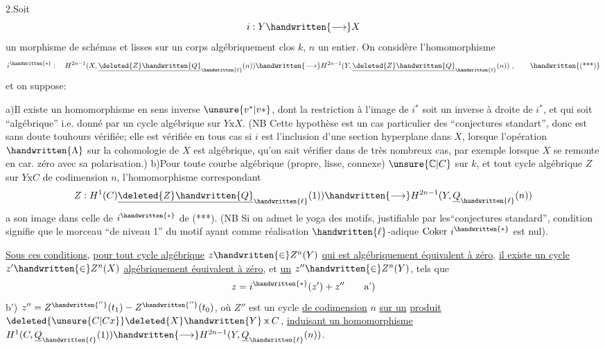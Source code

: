 2.\quad Soit
\[
i:Y\handwritten{\longrightarrow}X
\]
un morphisme de schémas  et lisses sur un corps algébriquement clos $k$, $n$ un entier. On  considère l'homomorphisme
\[
i^{\handwritten{*}}:\quad H^{2n-1}(X,\underline{\deleted{Z}\handwritten{Q}}_{\handwritten{\ell}}(n))\handwritten{\longrightarrow}H^{2n-1}(Y,\underline{\deleted{Z}\handwritten{Q}}_{\handwritten{\ell}}(n))\ ,\tag*{\handwritten{(***)}}
\]
et on suppose:

a)\quad Il existe un homomorphisme en sens inverse $\unsure{v^*|v*}$, dont la restriction à l'image de $i^*$ soit un inverse à droite de $i^*$, et qui soit ``algébrique'' i.e. donné par un cycle algébrique sur $Y\mathbin{\mathrm{x}}X$. (NB Cette hypothèse est un cas particulier des ``conjectures standart'', donc est sans doute touhours vérifiée; elle est vérifiée en tous cas si $i$ est l'inclusion d'une section hyperplane dans $X$, lorsque l'opération $\handwritten{\Lambda}$ sur  la cohomologie de $X$ est algébrique,   qu'on sait vérifier dans de très nombreux cas, par exemple lorsque $X$ se remonte en car. zéro avec sa polarisation.)
b)\quad Pour toute courbe algébrique (propre, lisse, connexe) $\unsure{\mathbb{C}|C}$ sur $k$, et tout cycle algébrique $Z$ sur $Y\mathbin{\mathrm{x}}C$ de codimension $n$, l'homomorphisme correspondant
\[
Z:H^1(C)\underline{\deleted{Z}\handwritten{Q}}_{\handwritten{\ell}}(1))\handwritten{\longrightarrow}H^{2n-1}(Y,\underline{Q}_{\handwritten{\ell}}(n))
\]
a son image dans celle de $i^{\handwritten{*}}$ de (***). (NB Si on admet le yoga des motifs, justifiable par les``conjectures standard'',  condition signifie que le  morceau  ``de niveau 1'' du motif  ayant comme réalisation $\handwritten{\ell}$-adique $\mathrm{Coker}\ i^{\handwritten{*}}$ est nul).

\uline{Sous ces conditions}, \uline{pour tout cycle algébrique} $z\handwritten{\in}Z^n(Y)$ \uline{qui est algébriquement équivalent à zéro}, \uline{il existe un cycle} $z'\handwritten{\in}Z^n(X)$ \uline{algébriquement équivalent à zéro}, et \uline{un} $z''\handwritten{\in}Z^n(Y)$, tels que
\[
z=i^{\handwritten{*}}(z')+z''\tag*{a')}
\]
b')\quad {} $z''=Z^{\handwritten{''}}(t_1)-Z^{\handwritten{''}}(t_0)$, où $Z''$ est un cycle \uline{de codimension} $n$ \uline{sur un} \uline{produit} $\deleted{\unsure{C|Cx}}\deleted{X}\handwritten{Y}\mathbin{\mathrm{x}}C$, \uline{induisant un homomorphisme}   $H^1(C,\underline{Q}_{\handwritten{\ell}}(1))\handwritten{\longrightarrow}H^{2n-1}(Y,\underline{Q}_{\handwritten{\ell}}(n))$.

